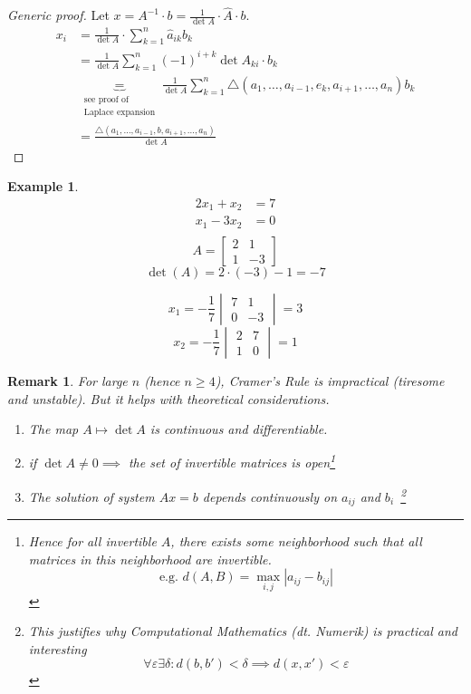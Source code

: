 \documentclass{article}
\newtheorem{example}{Example}  \numberwithin{example}{section}
\newtheorem{remark}{Remark}  \numberwithin{remark}{section}
\newcommand{\card}[1]{\left|#1\right|}
\begin{document}
\begin{proof}[Generic proof]
  Let $x = A^{-1} \cdot b = \frac{1}{\det{A}} \cdot \hat{A} \cdot b$.
  \begin{align*}
    x_i &= \frac{1}{\det{A}} \cdot \sum_{k=1}^n \hat{a}_{ik} b_k \\
        &= \frac{1}{\det{A}} \sum_{k=1}^n (-1)^{i+k} \det{A_{ki}} \cdot b_k \\
        &\underbrace{=}_{\substack{\text{see proof of} \\ \text{Laplace expansion}}} \frac{1}{\det{A}} \sum_{k=1}^n \triangle(a_1, \dots, a_{i-1}, e_k, a_{i+1}, \dots, a_n) b_k \\
        &= \frac{\triangle(a_1, \dots, a_{i-1}, b, a_{i+1}, \dots, a_n)}{\det{A}}
  \end{align*}
\end{proof}

\begin{example}
  \begin{align*}
    2x_1 + x_2 &= 7 \\
    x_1 - 3x_2 &= 0 \\
  \end{align*}%
%
  \[ A = \begin{bmatrix} 2 & 1 \\ 1 & -3 \end{bmatrix} \]
  \[ \det(A) = 2 \cdot (-3) - 1 = -7 \]

  \[ x_1 = -\frac17 \begin{vmatrix} 7 & 1 \\ 0 & -3 \end{vmatrix} = 3 \]
  \[ x_2 = -\frac17 \begin{vmatrix} 2 & 7 \\ 1 & 0 \end{vmatrix} = 1 \]
\end{example}

\begin{remark}
  For large $n$ (hence $n \geq 4$), Cramer's Rule is impractical (tiresome and unstable).
  But it helps with theoretical considerations.
  \begin{enumerate}
    \item The map $A \mapsto \det{A}$ is continuous and differentiable.
    \item if $\det{A} \neq 0 \implies$ the set of invertible matrices is open\footnote{Hence for all invertible $A$, there exists some neighborhood such that all matrices in this neighborhood are invertible. \[ \text{e.g. } d(A, B) = \max_{i,j} \card{a_{ij} - b_{ij}} \]}
    \item The solution of system $Ax = b$ depends continuously on $a_{ij}$ and $b_i$~\footnote{
      This justifies why Computational Mathematics (dt. \foreignlanguage{german}{Numerik}) is practical and interesting
      \[ \forall \varepsilon \exists \delta: d(b, b') < \delta \implies d(x, x') < \varepsilon \]
    }
  \end{enumerate}
\end{remark}
\end{document}
